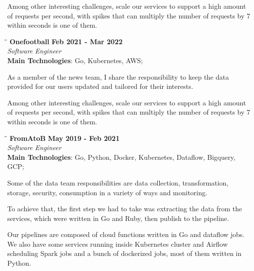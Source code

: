 \documentclass[margin]{res}
\begin{document}
\begin{resume}
Among other interesting challenges, scale our services to support a high amount of requests per second, with spikes that can multiply the number of requests by 7 within seconds is one of them.


\vspace{-0.1in}
   \begin{tabbing}
   \hspace{2.3in}\= \hspace{1.7in}\= \kill %
    \textbf{Onefootball}    \>\>\textbf{Feb 2021 - Mar 2022}\\
    \textit{Software Engineer}\\
    \textbf{Main Technologies}: Go, Kubernetes, AWS;
   \end{tabbing}\vspace{-20pt}      %
    \vspace{2mm}

As a member of the news team, I share the responsibility to keep the data provided for our users updated and tailored for their interests.

Among other interesting challenges, scale our services to support a high amount of requests per second, with spikes that can multiply the number of requests by 7 within seconds is one of them.


\vspace{-0.1in}
   \begin{tabbing}
   \hspace{2.3in}\= \hspace{1.7in}\= \kill %
    \textbf{FromAtoB}    \>\>\textbf{May 2019 - Feb 2021}\\
    \textit{Software Engineer}\\
    \textbf{Main Technologies}: Go, Python, Docker, Kubernetes, Dataflow, Bigquery, GCP;
   \end{tabbing}\vspace{-20pt}      %
    \vspace{2mm}

Some of the data team responsibilities are data collection, transformation, storage, security, consumption in a variety of ways and monitoring.

To achieve that, the first step we had to take was extracting the data from the services, which were written in Go and Ruby, then publish to the pipeline.

Our pipelines are composed of cloud functions written in Go and dataflow jobs.
We also have some services running inside Kubernetes cluster and Airflow scheduling Spark jobs and a bunch of dockerized jobs, most of them written in Python.



\end{resume}
\end{document}
